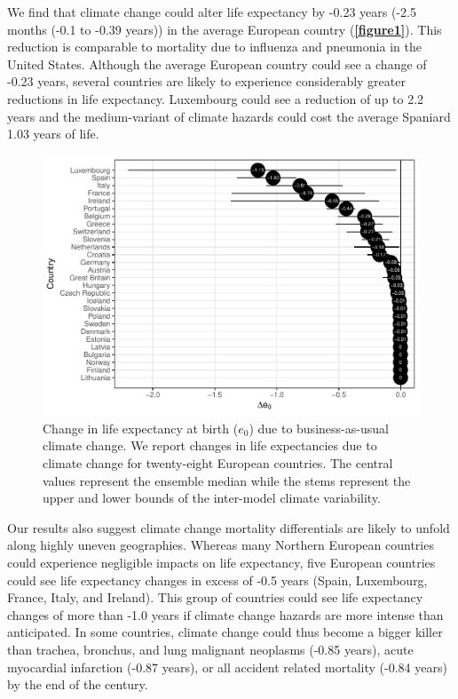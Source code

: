 \documentclass[12pt,]{article}
\makeatletter
\def\maxwidth{\ifdim\Gin@nat@width>\linewidth\linewidth
\else\Gin@nat@width\fi}
\let\Oldincludegraphics\includegraphics
\renewcommand{\includegraphics}[1]{\Oldincludegraphics[width=\maxwidth]{#1}}
\makeatother
\begin{document}
We find that climate change could alter life expectancy by -0.23 years
(-2.5 months (-0.1 to -0.39 years)) in the average European country
(\textbf{\autoref{figure1}}). This reduction is comparable to mortality
due to influenza and pneumonia \citep{arias2013united} in the United
States. Although the average European country could see a change of
-0.23 years, several countries are likely to experience considerably
greater reductions in life expectancy. Luxembourg could see a reduction
of up to 2.2 years and the medium-variant of climate hazards could cost
the average Spaniard 1.03 years of life.

\begin{figure}
\centering
\includegraphics{MS-cclifeexpec_files/figure-latex/figure1-1.pdf}
\caption{Change in life expectancy at birth (\(e_0\)) due to
business-as-usual climate change. We report changes in life expectancies
due to climate change for twenty-eight European countries. The central
values represent the ensemble median while the stems represent the upper
and lower bounds of the inter-model climate variability.\label{figure1}}
\end{figure}

Our results also suggest climate change mortality differentials are
likely to unfold along highly uneven geographies. Whereas many Northern
European countries could experience negligible impacts on life
expectancy, five European countries could see life expectancy changes in
excess of -0.5 years (Spain, Luxembourg, France, Italy, and Ireland).
This group of countries could see life expectancy changes of more than
-1.0 years if climate change hazards are more intense than anticipated.
In some countries, climate change could thus become a bigger killer than
trachea, bronchus, and lung malignant neoplasms (-0.85 years), acute
myocardial infarction (-0.87 years), or all accident related mortality
(-0.84 years) \citep{arias2013united} by the end of the century.
\end{document}
